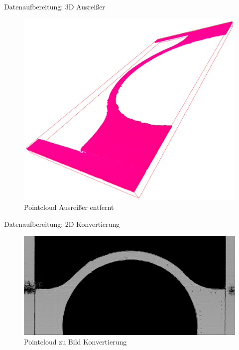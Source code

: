 \documentclass[../slides.tex]{subfiles}
\begin{document}
\begin{frame}{Datenaufbereitung: 3D Ausreißer}
    \begin{figure}
        \centering
        \includegraphics[width=\textwidth]{img_niklas/pc_without_outliers.PNG}
        \caption{Pointcloud Ausreißer entfernt}
        \label{fig:pcnooultiers}
    \end{figure}
\end{frame}

\begin{frame}{Datenaufbereitung: 2D Konvertierung}
    \begin{figure}
        \centering
        \includegraphics[width=\textwidth]{img_niklas/fdm_top_100p.png}
        \caption{Pointcloud zu Bild Konvertierung}
        \label{fig:imageall}
    \end{figure}
\end{frame}
\end{document}
